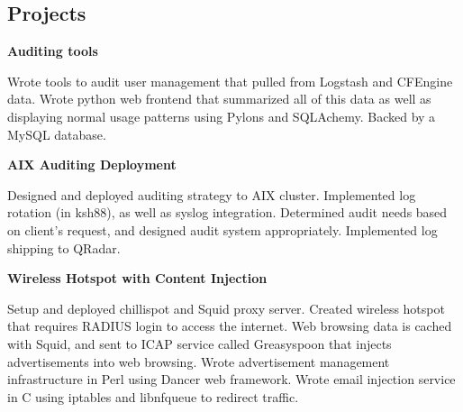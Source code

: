 \documentclass[letter,margin,line]{resume}
\begin{document}
\begin{resume}
\section{\mysidestyle Projects}
	\begin{asparablank}
		\item {\bf Auditing tools}
		
		\small Wrote tools to audit user management that pulled from Logstash and CFEngine data. Wrote
		python web frontend that summarized all of this data as well as displaying normal usage patterns
		using Pylons and SQLAchemy. Backed by a MySQL database.
		\normalsize
		\\
		
		\item {\bf AIX Auditing Deployment}
		
		\small Designed and deployed auditing strategy to AIX cluster.
		Implemented log rotation (in ksh88), as well as syslog
		integration. Determined audit needs based on client's request,
		and designed audit system appropriately. Implemented log
		shipping to QRadar.
		\normalsize
		\\
		
		\item {\bf Wireless Hotspot with Content Injection}
		
		\small Setup and deployed chillispot and Squid proxy server.
        Created wireless hotspot that requires RADIUS login to access the
        internet. Web browsing data is cached with Squid, and sent to ICAP
        service called Greasyspoon that injects advertisements into web
        browsing. Wrote advertisement management infrastructure in Perl using
        Dancer web framework. Wrote email injection service in C using iptables
        and libnfqueue to redirect traffic.
		\normalsize
		\\
	\end{asparablank}	
\end{resume}
\end{document}
